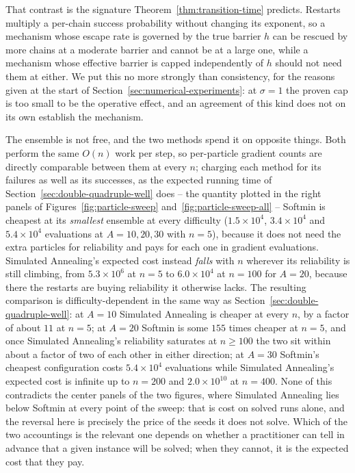 \documentclass{article} %
\theoremstyle{plain}
\theoremstyle{definition}
\theoremstyle{remark}
\begin{document}
That contrast is the signature Theorem~\ref{thm:transition-time} predicts. Restarts multiply a
per-chain success probability without changing its exponent, so a mechanism whose escape rate is
governed by the true barrier $h$ can be rescued by more chains at a moderate barrier and cannot be
at a large one, while a mechanism whose effective barrier is capped independently of $h$ should not
need them at either. We put this no more strongly than consistency, for the reasons given at the start of Section~\ref{sec:numerical-experiments}: at $\sigma=1$ the proven cap is too small to be the operative effect, and an
agreement of this kind does not on its own establish the mechanism.

The ensemble is not free, and the two methods spend it on opposite things. Both perform the same
$O(n)$ work per step, so per-particle gradient counts are directly comparable between them at
every $n$; charging each method for its failures as well as its successes, as the expected running
time of Section~\ref{sec:double-quadruple-well} does -- the quantity plotted in the right panels of
Figures~\ref{fig:particle-sweep} and~\ref{fig:particle-sweep-all} -- Softmin is cheapest at its \emph{smallest}
ensemble at every difficulty ($1.5\times10^4$, $3.4\times10^4$ and $5.4\times10^4$ evaluations at
$A=10,20,30$ with $n=5$), because it does not need the extra particles for reliability and pays for
each one in gradient evaluations. Simulated Annealing's expected cost instead \emph{falls} with $n$
wherever its reliability is still climbing, from $5.3\times10^6$ at $n=5$ to $6.0\times10^4$ at
$n=100$ for $A=20$, because there the restarts are buying reliability it otherwise lacks. The
resulting comparison is difficulty-dependent in the same way as Section~\ref{sec:double-quadruple-well}:
at $A=10$ Simulated Annealing is cheaper at every $n$, by a factor of about $11$ at $n=5$; at
$A=20$ Softmin is some $155$ times cheaper at $n=5$, and once Simulated Annealing's reliability
saturates at $n\geq100$ the two sit within about a factor of two of each other in either direction;
at $A=30$ Softmin's cheapest configuration costs $5.4\times10^4$ evaluations while Simulated
Annealing's expected cost is infinite up to $n=200$ and $2.0\times10^{10}$ at $n=400$. None of this
contradicts the center panels of the two figures, where Simulated Annealing lies below Softmin at
every point of the sweep: that is cost on solved runs alone, and the reversal here is precisely the
price of the seeds it does not solve. Which of the two accountings is the relevant one depends on
whether a practitioner can tell in advance that a given instance will be solved; when they cannot,
it is the expected cost that they pay.
\end{document}

